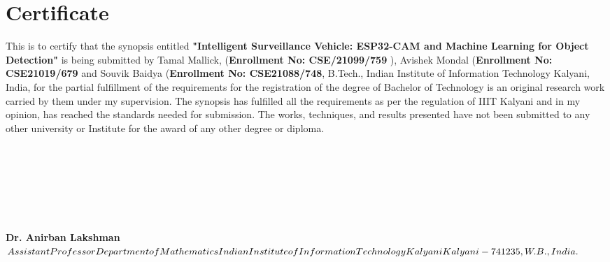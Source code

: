 \documentclass[12pt,a4paper]{report}
\newcommand{\mytitle}{Intelligent Surveillance Vehicle: ESP32-CAM and Machine Learning for Object Detection}
\begin{document}
%
	\newpage
	\chapter*{\centering Certificate}
\label{sec:engack}
This is to certify that the synopsis entitled \textbf{"\mytitle "} is being submitted by Tamal Mallick,
 (\textbf{Enrollment No: CSE/21099/759 }), Avishek Mondal (\textbf{Enrollment No: CSE21019/679} and Souvik Baidya (\textbf{Enrollment No: CSE21088/748}, B.Tech., Indian Institute of Information Technology Kalyani, India, for the partial fulfillment of the requirements for the registration of the degree of Bachelor of Technology is an original research work carried by them under my supervision. The synopsis has fulfilled all the requirements as per the regulation of IIIT Kalyani and in my opinion, has reached the standards needed for submission. The works, techniques, and results presented have not been submitted to any other university or Institute for the award of any other degree or diploma.
\\
\\
\\
\\
\\
\\
\\
\\
\textbf{Dr. Anirban Lakshman}  \\ 
$Assistant Professor \\  
Department of Mathematics\\
Indian Institute of Information Technology Kalyani\\
Kalyani-741235, W.B., India.
$
\cleardoublepage
\end{document}
